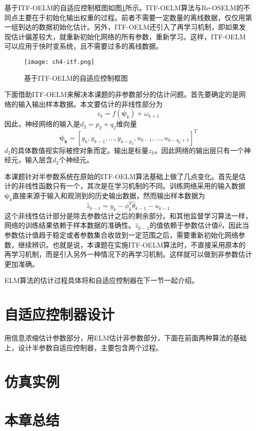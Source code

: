 基于ITF-OELM的自适应控制框图如图\ref{fig.itf-oelm}所示。ITF-OELM算法与Re-OSELM的不同点主要在于初始化输出权重的过程。前者不需要一定数量的离线数据，仅仅用第一组到达的数据初始化估计。另外，ITF-OELM还引入了再学习机制，即如果发现估计偏差较大，就重新初始化网络的所有参数，重新学习。这样，ITF-OELM可以应用于快时变系统，且不需要过多的离线数据。
\begin{figure}[!htb]
  \centering
  \texttt{[image: ch4-itf.png]}\\	 %
  \caption{基于ITF-OELM的自适应控制框图}
  \label{fig.itf-oelm}
\end{figure}

下面借助ITF-OELM来解决本课题的非参数部分的估计问题。首先要确定的是网络的输入输出样本数据。本文要估计的非线性部分为
\begin{equation}
z_{k} = f(\bm{\psi}_{k}) + \omega_{k+1}
\end{equation}
因此，神经网络的输入是$d_{2}=p_{2}+q_{2}$维向量
$$\bm{\psi_{k}}=[y_{k},y_{k-1},\ldots,y_{k-p_{2}},u_{k-1},\dots,u_{k-q_{2}+1}]^{T}$$
$d_{2}$的具体数值视实际被控对象而定。输出是标量$z_{k}$。因此网络的输出层只有一个神经元，输入层含$d_{2}$个神经元。

本课题针对半参数系统在原始的ITF-OELM算法基础上做了几点变化。首先是估计的非线性函数只有一个，其次是在学习机制的不同。训练网络采用的输入数据$\bm{\psi}_{k}$直接来源于输入和观测到的历史输出数据，然而输出样本数据为
\begin{equation}
\hat{z}_{k-1}=y_{k}-\phi_{k}^{T}\hat{\theta}_{k-1}-u_{k-1}
\end{equation}
这个非线性估计部分是除去参数估计之后的剩余部分。和其他监督学习算法一样，网络的训练结果依赖于样本数据的准确性。$\hat{z}_{k-1}$的值依赖于参数估计值$\hat{\theta}$，因此当参数估计值趋于稳定或者参数集合收敛到一定范围之后，需要重新初始化网络参数，继续辨识。也就是说，本课题在实施ITF-OELM算法时，不直接采用原本的再学习机制，而是引入另外一种情况下的再学习机制。这样就可以做到非参数估计更加准确。

ELM算法的估计过程具体将和自适应控制器在下一节一起介绍。

\section{自适应控制器设计}
用信息浓缩估计参数部分，用ELM估计非参数部分，下面在前面两种算法的基础上，设计半参数自适应控制器，主要包含两个过程。

\section{仿真实例}

\section{本章总结}